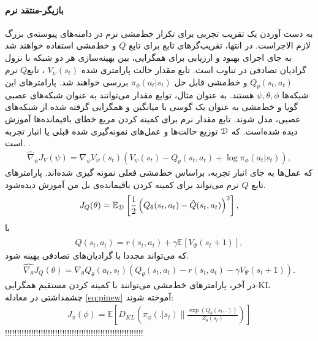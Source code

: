  \paragraph{بازیگر-منتقد نرم}
به دست آوردن یک تقریب تجربی برای تکرار خط‌مشی نرم در دامنه‌های پیوسته‌ی بزرگ لازم الاجراست.  در انتها، تقریب‌گرهای تابع برای تابع
$ Q$
 و خط‌مشی استفاده خواهند شد به جای اجرای بهبود و ارزیابی برای همگرایی، بین بهینه‌سازی هر دو شبکه با نزول گرادیان تصادفی در تناوب است. تابع مقدار حالت پارامتری شده
 $V_\psi (s_t)$
 ، تابع$Q$ نرم 
 $Q_\theta (s_t,a_t)$
  و خط‌مشی قابل حل 
  $\pi_\phi (a_t | s_t)$
  بررسی خواهند شد. پارامترهای این شبکه‌ها 
  $\psi, \theta, \phi$
   هستند. به عنوان مثال، توابع مقدار می‌توانند به عنوان شبکه‌های عصبی گویا و خط‌مشی به عنوان یک گوسی با میانگین و همگرایی گرفته شده از شبکه‌های عصبی، مدل شوند.
تابع مقدار نرم برای کمینه کردن مربع خطای باقیمانده‌ها آموزش دیده شده‌است.
که 
$\EuScript{D}$
 توزیع حالت‌ها و عمل‌های نمونه‌گیری شده قبلی یا انبار تجربه است. .
\begin{align}
\hat{\nabla}_\psi J_V (\psi) = \nabla_\psi V_\psi (s_t) (V_\psi (s_t)-Q_\theta(s_t,a_t)+\log \pi_\phi (a_t |s_t)) ,
\end{align}
که عمل‌ها به جای انبار تجربه، براساس خط‌مشی فعلی نمونه گیری شده‌اند. پارامترهای تابع $Q$ نرم می‌تواند برای کمینه کردن باقیمانده‌ی بل من آموزش دیده‌شود.
\begin{align}
J_Q(\theta) = \mathbb{E}_{\EuScript{D}} \left[ \frac{1}{2} \left( Q_\theta (s_t,a_t)- \hat{Q} (s_t,a_t)\right)^2 \right] ,
\end{align}
با 
\begin{align*}
\hat{Q} (s_t,a_t) = r(s_t,a_t) + \gamma \mathbb{E} [V_\Psi (s_t+1)] ,
\end{align*}
که می‌تواند مجددا با گرادیان‌های تصادفی بهینه شود.
\begin{align}
\hat{\nabla_{\theta}} J_Q (\theta) = \nabla_\theta Q_\theta (a_t,s_t) \left( Q_\theta (s_t,a_t)- r(s_t,a_t) - \gamma V_\Psi (s_t+1) \right). 
\end{align}
در آخر، پارامترهای خط‌مشی می‌توانند با کمینه کردن مستقیم همگرایی-KL چشمداشتی در معادله \ref{eq:pinew} آموخته شوند:
\begin{align}
J_\pi(\phi) = \mathbb{E}\left[ D_{KL}  \left( \pi_\phi(.|s_t) \parallel \frac{\exp{(Q_{\theta} (s_t,.))}}{Z_{\theta} (s_t)}\right) \right]
\end{align}
!!!!!!!!!!!!!!!!!!!!!!!!!!!!!!!!!!!!!!!!!!!!!!!!!!!!!!!!!!


